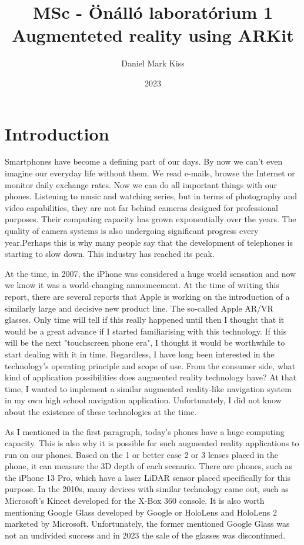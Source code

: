 \documentclass[11pt,a4paper,oneside]{report}
\title{\Huge{MSc - Önálló laboratórium 1}\\Augmenteted reality using ARKit}
\author{\huge{Daniel Mark Kiss}}
\date{2023}
\begin{document}
\maketitle
\newpage
\tableofcontents
\pagebreak

\chapter{Introduction}

Smartphones have become a defining part of our days. By now we can't even imagine our everyday life without them. We read e-mails, browse the Internet or monitor daily exchange rates. Now we can do all important things with our phones. Listening to music and watching series, but in terms of photography and video capabilities, they are not far behind cameras designed for professional purposes. Their computing capacity has grown exponentially over the years. The quality of camera systems is also undergoing significant progress every year.Perhaps this is why many people say that the development of telephones is starting to slow down. This industry has reached its peak.

At the time, in 2007, the iPhone was considered a huge world sensation and now we know it was a world-changing announcement. At the time of writing this report, there are several reports that Apple is working on the introduction of a similarly large and decisive new product line. The so-called Apple AR/VR glasses. Only time will tell if this really happened until then I thought that it would be a great advance if I started familiarising with this technology. If this will be the next "touchscreen phone era", I thought it would be worthwhile to start dealing with it in time. Regardless, I have long been interested in the technology's operating principle and scope of use. From the consumer side, what kind of application possibilities does augmented reality technology have? At that time, I wanted to implement a similar augmented reality-like navigation system in my own high school navigation application. Unfortunately, I did not know about the existence of these technologies at the time.

As I mentioned in the first paragraph, today's phones have a huge computing capacity. This is also why it is possible for such augmented reality applications to run on our phones. Based on the 1 or better case 2 or 3 lenses placed in the phone, it can measure the 3D depth of each scenario. There are phones, such as the iPhone 13 Pro, which have a laser LiDAR sensor placed specifically for this purpose. In the 2010s, many devices with similar technology came out, such as Microsoft's Kinect developed for the X-Box 360 console. It is also worth mentioning Google Glass developed by Google or HoloLens and HoloLens 2 marketed by Microsoft. Unfortunately, the former mentioned Google Glass was not an undivided success and in 2023 the sale of the glasses was discontinued.
\end{document}

